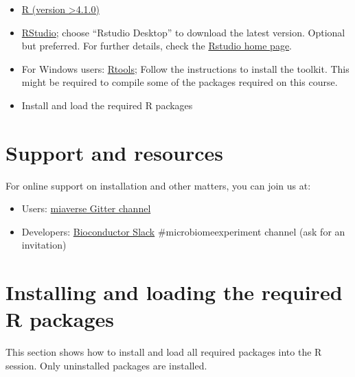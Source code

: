 \documentclass[
  oneside]{book}
\providecommand{\tightlist}{%
  \setlength{\itemsep}{0pt}\setlength{\parskip}{0pt}}
\begin{document}
\begin{itemize}
\item
  \href{https://www.r-project.org/}{R (version \textgreater4.1.0)}
\item
  \href{https://www.rstudio.com/products/rstudio/download/}{RStudio};
  choose ``Rstudio Desktop'' to download the latest version. Optional
  but preferred. For further details, check the \href{https://www.rstudio.com/}{Rstudio home
  page}.
\item
  For Windows users: \href{https://cran.r-project.org/bin/windows/Rtools/rtools40.html}{Rtools};
  Follow the instructions to install the toolkit. This might be required to compile some of the
  packages required on this course.
\item
  Install and load the required R packages
\end{itemize}

\hypertarget{support-and-resources}{%
\section{Support and resources}\label{support-and-resources}}

For online support on installation and other matters, you can join us at:

\begin{itemize}
\tightlist
\item
  Users: \href{https://gitter.im/microbiome/miaverse?utm_source=badge\&utm_medium=badge\&utm_campaign=pr-badge\&utm_content=badge}{miaverse Gitter channel}
\item
  Developers: \href{https://bioc-community.herokuapp.com}{Bioconductor Slack} \#microbiomeexperiment channel (ask for an invitation)
\end{itemize}

\hypertarget{installing-and-loading-the-required-r-packages}{%
\section{Installing and loading the required R packages}\label{installing-and-loading-the-required-r-packages}}

This section shows how to install and load all required packages into
the R session. Only uninstalled packages are installed.
\end{document}

